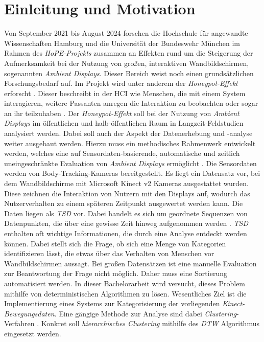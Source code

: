 \chapter{Einleitung und Motivation}
\label{chapter1}
Von September 2021 bis August 2024 forschen die Hochschule für angewandte Wissenschaften Hamburg
und die Universität der Bundeswehr München im Rahmen des \emph{HoPE-Projekts} zusammen an Effekten
rund um die Steigerung der Aufmerksamkeit bei der Nutzung von großen, interaktiven Wandbildschirmen,
sogenannten \emph{Ambient Displays}.
Dieser Bereich weist noch einen grundsätzlichen Forschungsbedarf auf.
Im Projekt wird unter anderem der \emph{Honeypot-Effekt} erforscht \citep{unibw_honeypot-effekt_2021}.
Dieser beschreibt in der \ac{HCI} wie Menschen, die mit einem System interagieren,
weitere Passanten anregen die Interaktion zu beobachten oder sogar an ihr teilzuhaben \citep{wouters_uncovering_2016}.
Der \emph{Honeypot-Effekt} soll bei der Nutzung von \emph{Ambient Displays} im öffentlichen
und halb-öffentlichen Raum in Langzeit-Feldstudien analysiert werden.
Dabei soll auch der Aspekt der Datenerhebung und -analyse weiter ausgebaut werden.
Hierzu muss ein methodisches Rahmenwerk entwickelt werden, welches eine auf Sensordaten-basierende,
automatische und zeitlich uneingeschränkte Evaluation von \emph{Ambient Displays} ermöglicht \citep{unibw_honeypot-effekt_2021}.
Die Sensordaten werden von Body-Tracking-Kameras bereitgestellt.
Es liegt ein Datensatz vor, bei dem Wandbildschirme mit Microsoft Kinect v2 Kameras ausgestattet wurden.
Diese zeichnen die Interaktion von Nutzern mit den Displays auf,
wodurch das Nutzerverhalten zu einem späteren Zeitpunkt ausgewertet werden kann.
Die Daten liegen als \emph{\ac{TSD}} vor.
Dabei handelt es sich um geordnete Sequenzen von Datenpunkten,
die über eine gewisse Zeit hinweg aufgenommen werden \citep{ali_clustering_2019}.
\emph{\ac{TSD}} enthalten oft wichtige Informationen, die durch eine Analyse entdeckt werden können.
Dabei stellt sich die Frage, ob sich eine Menge von Kategorien identifizieren lässt,
die etwas über das Verhalten von Menschen vor Wandbildschirmen aussagt.
Bei großen Datensätzen ist eine manuelle Evaluation zur Beantwortung der Frage nicht möglich.
Daher muss eine Sortierung automatisiert werden.
In dieser Bachelorarbeit wird versucht, dieses Problem mithilfe von deterministischen Algorithmen zu lösen.
Wesentliches Ziel ist die Implementierung eines Systems zur Kategorisierung der vorliegenden \emph{Kinect-Bewegungsdaten}.
Eine gängige Methode zur Analyse sind dabei \emph{Clustering}-Verfahren \citep{aghabozorgi_time-series_2015}.
Konkret soll \emph{hierarchisches Clustering} mithilfe des \emph{\ac{DTW}} Algorithmus eingesetzt werden.

